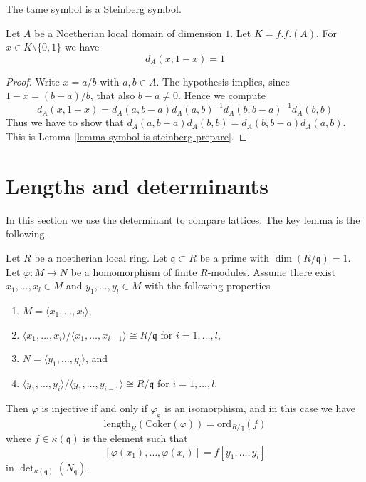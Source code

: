 \noindent
The tame symbol is a Steinberg symbol.

\begin{lemma}
\label{lemma-symbol-is-steinberg}
Let $A$ be a Noetherian local domain of dimension $1$.
Let $K = f.f.(A)$. For $x \in K \setminus \{0, 1\}$
we have
$$
d_A(x, 1 -x) = 1
$$
\end{lemma}

\begin{proof}
Write $x = a/b$ with $a, b \in A$.
The hypothesis implies, since $1 - x = (b - a)/b$,
that also $b - a \not = 0$. Hence we compute
$$
d_A(x, 1 - x)
=
d_A(a, b - a)d_A(a, b)^{-1}d_A(b, b - a)^{-1}d_A(b, b)
$$
Thus we have to show that
$d_A(a, b - a) d_A(b, b) = d_A(b, b - a) d_A(a, b)$.
This is Lemma \ref{lemma-symbol-is-steinberg-prepare}.
\end{proof}










\section{Lengths and determinants}
\label{section-length-determinant}

\noindent
In this section we use the determinant to compare lattices.
The key lemma is the following.

\begin{lemma}
\label{lemma-key-lemma}
Let $R$ be a noetherian local ring.
Let $\mathfrak q \subset R$ be a prime with $\dim(R/\mathfrak q) = 1$.
Let $\varphi : M \to N$ be a homomorphism of finite $R$-modules.
Assume there exist $x_1, \ldots, x_l \in M$ and $y_1, \ldots, y_l \in M$
with the following properties
\begin{enumerate}
\item $M = \langle x_1, \ldots, x_l\rangle$,
\item $\langle x_1, \ldots, x_i\rangle / \langle x_1, \ldots, x_{i - 1}\rangle
\cong R/\mathfrak q$ for $i = 1, \ldots, l$,
\item $N = \langle y_1, \ldots, y_l\rangle$, and
\item $\langle y_1, \ldots, y_i\rangle / \langle y_1, \ldots, y_{i - 1}\rangle
\cong R/\mathfrak q$ for $i = 1, \ldots, l$.
\end{enumerate}
Then $\varphi$ is injective if and only if $\varphi_{\mathfrak q}$ is an
isomorphism, and in this case we have
$$
\text{length}_R(\text{Coker}(\varphi)) = \text{ord}_{R/\mathfrak q}(f)
$$
where $f \in \kappa(\mathfrak q)$ is the element such that
$$
[\varphi(x_1), \ldots, \varphi(x_l)] = f [y_1, \ldots, y_l]
$$
in $\det_{\kappa(\mathfrak q)}(N_{\mathfrak q})$.
\end{lemma}

